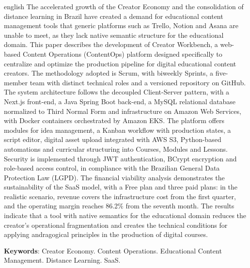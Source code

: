 \begin{resumo}[Abstract]
\begin{otherlanguage*}{english}
The accelerated growth of the Creator Economy and the consolidation of distance 
learning in Brazil have created a demand for educational content management tools 
that generic platforms such as Trello, Notion and Asana are unable to meet, as they 
lack native semantic structure for the educational domain. This paper describes the 
development of Creator Workbench, a web-based Content Operations (ContentOps) 
platform designed specifically to centralize and optimize the production pipeline for 
digital educational content creators. The methodology adopted is Scrum, with 
biweekly Sprints, a five-member team with distinct technical roles and a versioned 
repository on GitHub. The system architecture follows the decoupled Client-Server 
pattern, with a Next.js front-end, a Java Spring Boot back-end, a MySQL relational 
database normalized to Third Normal Form and infrastructure on Amazon Web Services,
with Docker containers orchestrated by Amazon EKS. The platform offers modules for idea management, a Kanban workflow 
with production states, a script editor, digital asset upload integrated with AWS S3, 
Python-based automations and curricular structuring into Courses, Modules and 
Lessons. Security is implemented through JWT authentication, BCrypt encryption and
role-based access control, in compliance with the Brazilian General Data Protection Law 
(LGPD). The financial viability analysis demonstrates the sustainability of the SaaS 
model, with a Free plan and three paid plans: in the realistic scenario, revenue covers
the infrastructure cost from the first quarter, and the operating margin reaches
86.2\% from the seventh month. The results indicate that a tool with native 
semantics for the educational domain reduces the creator's operational fragmentation 
and creates the technical conditions for applying andragogical principles in the 
production of digital courses.

\vspace{\onelineskip}
\noindent
\textbf{Keywords}: Creator Economy. Content Operations. Educational Content Management. Distance Learning. SaaS.
\end{otherlanguage*}
\end{resumo}

% 

%  

